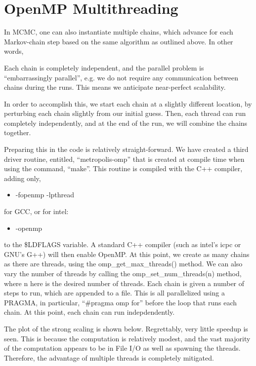 \documentclass{article}
\begin{document}
\section{OpenMP Multithreading}

In MCMC, one can also instantiate multiple chains, which advance for each 
Markov-chain step based on the same algorithm as outlined above. In other words, 

Each chain is completely independent, and the parallel problem is ``embarrassingly parallel'', e.g. we 
do not require any communication between chains during the runs. This means we anticipate near-perfect scalability. 

In order to accomplish this, we start each chain at a slightly different location, by perturbing each chain 
slightly from our initial guess. Then, each thread can run completely independently, and at the end of the run, 
we will combine the chains together. 

Preparing this in the code is relatively straight-forward. We have created a third driver routine, entitled, ``metropolis-omp'' that is created at compile time when using the command, ``make''. This routine is compiled with the C++ compiler, adding only, 

\begin{itemize}
\item -fopenmp -lpthread
\end{itemize}
for GCC, or for intel:

\begin{itemize}
\item -openmp
\end{itemize}

to the \$LDFLAGS variable. A standard C++ compiler (such as intel's icpc or GNU's G++) will then enable OpenMP. 
At this point, we create as many chains as there are threads, using the omp\_get\_max\_threads() method. We can also
vary the number of threads by calling the omp\_set\_num\_threads(n) method, where n here is the desired number of threads.
Each chain is given a number of steps to run, which are appended to a file. This is all parallelized 
using a PRAGMA, in particular, ``\#pragma omp for'' before the loop that runs each chain. 
At this point, each chain can run indepdendently. 

The plot of the strong scaling is shown below. Regrettably, very little speedup is seen. This is because the computation is relatively modest, 
and the vast majority of the computation appears to be in File I/O as well as spawning the threads. Therefore,
the advantage of multiple threads is completely mitigated. 
\end{document}
